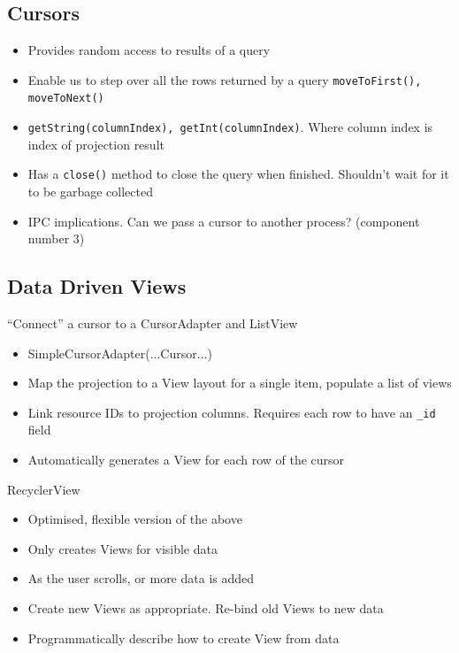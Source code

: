 \documentclass{article}
\begin{document}
\subsection{Cursors}

\begin{itemize}
  \item Provides random access to results of a query
  \item Enable us to step over all the rows returned by a query \verb|moveToFirst(), moveToNext()| 
  \item \verb|getString(columnIndex), getInt(columnIndex)|. Where column index is index of projection result 
  \item Has a \verb|close()| method to close the query when finished. Shouldn’t wait for it to be garbage collected 
  \item IPC implications. Can we pass a cursor to another process? (component number 3)
\end{itemize}

\subsection{Data Driven Views}

\begin{flushleft}
“Connect” a cursor to a CursorAdapter and ListView
\begin{itemize}
  \item SimpleCursorAdapter(...Cursor...) 
  \item Map the projection to a View layout for a single item, populate a list of views 
  \item Link resource IDs to projection columns. Requires each row to have an \verb|_id| field 
  \item Automatically generates a View for each row of the cursor
\end{itemize}
RecyclerView
\begin{itemize}
  \item Optimised, flexible version of the above 
  \item Only creates Views for visible data 
  \item As the user scrolls, or more data is added 
  \item Create new Views as appropriate. Re-bind old Views to new data 
  \item Programmatically describe how to create View from data
\end{itemize}
\end{flushleft}
\end{document}
